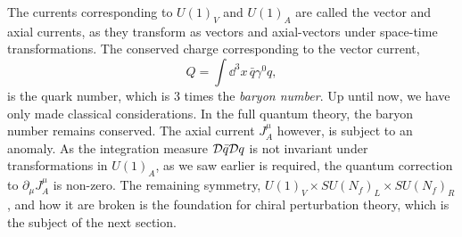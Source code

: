 The currents corresponding to $U(1)_V$ and $U(1)_A$ are called the vector and axial currents, as they transform as vectors and axial-vectors under space-time transformations.
The conserved charge corresponding to the vector current,
\begin{equation}
    Q = \int \dd^3 x \, \bar q \gamma^0 q,
\end{equation}
is the quark number, which is $3$ times the \emph{baryon number}.
Up until now, we have only made classical considerations.
In the full quantum theory, the baryon number remains conserved.
The axial current $J^\mu_A$ however, is subject to an anomaly.
As the integration measure $\mathcal{D}\bar q \mathcal{D} q$ is not invariant under transformations in $U(1)_A$, as we saw earlier is required, the quantum correction to $\partial_\mu J^\mu_A$ is non-zero.
The remaining symmetry, $U(1)_V \times SU(N_f)_L \times SU(N_f)_R$, and how it are broken is the foundation for chiral perturbation theory, which is the subject of the next section.
